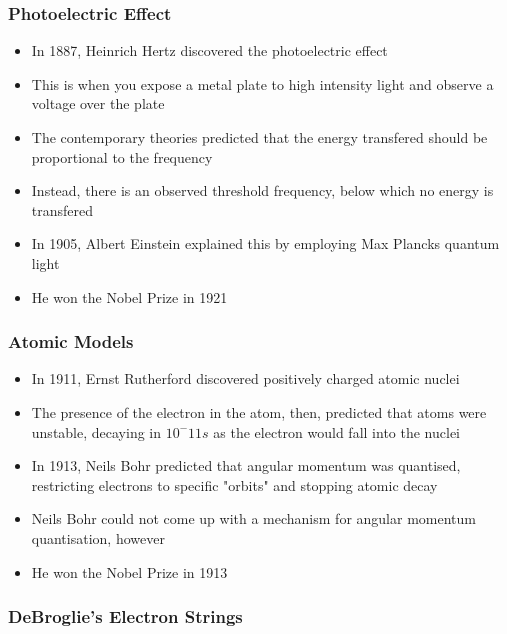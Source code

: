 \documentclass{article}
\begin{document}
\subsubsection*{Photoelectric Effect}

\begin{itemize}
    \item In 1887, Heinrich Hertz discovered the photoelectric effect
    \item This is when you expose a metal plate to high intensity light and observe a voltage over the plate
    \item The contemporary theories predicted that the energy transfered should be proportional to the frequency
    \item Instead, there is an observed threshold frequency, below which no energy is transfered
    \item In 1905, Albert Einstein explained this by employing Max Plancks quantum light
    \item He won the Nobel Prize in 1921
\end{itemize}

\subsubsection*{Atomic Models}

\begin{itemize}
    \item In 1911, Ernst Rutherford discovered positively charged atomic nuclei
    \item The presence of the electron in the atom, then, predicted that atoms were unstable, decaying in $10^-11 s$ as the electron would fall into the nuclei 
    \item In 1913, Neils Bohr predicted that angular momentum was quantised, restricting electrons to specific "orbits" and stopping atomic decay
    \item Neils Bohr could not come up with a mechanism for angular momentum quantisation, however
    \item He won the Nobel Prize in 1913
\end{itemize}

\subsubsection*{DeBroglie's Electron Strings}
\end{document}

